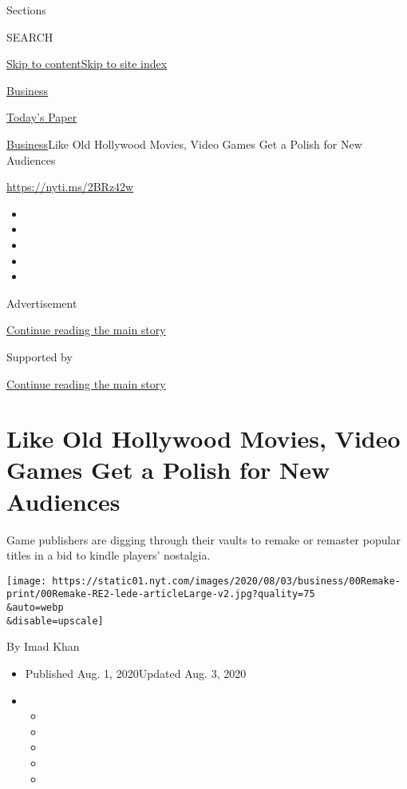 Sections

SEARCH

\protect\hyperlink{site-content}{Skip to
content}\protect\hyperlink{site-index}{Skip to site index}

\href{https://www.nytimes.com/section/business}{Business}

\href{https://myaccount.nytimes.com/auth/login?response_type=cookie\&client_id=vi}{}

\href{https://www.nytimes.com/section/todayspaper}{Today's Paper}

\href{/section/business}{Business}\textbar{}Like Old Hollywood Movies,
Video Games Get a Polish for New Audiences

\url{https://nyti.ms/2BRz42w}

\begin{itemize}
\item
\item
\item
\item
\item
\end{itemize}

Advertisement

\protect\hyperlink{after-top}{Continue reading the main story}

Supported by

\protect\hyperlink{after-sponsor}{Continue reading the main story}

\hypertarget{like-old-hollywood-movies-video-games-get-a-polish-for-new-audiences}{%
\section{Like Old Hollywood Movies, Video Games Get a Polish for New
Audiences}\label{like-old-hollywood-movies-video-games-get-a-polish-for-new-audiences}}

Game publishers are digging through their vaults to remake or remaster
popular titles in a bid to kindle players' nostalgia.

\texttt{[image: https://static01.nyt.com/images/2020/08/03/business/00Remake-print/00Remake-RE2-lede-articleLarge-v2.jpg?quality=75\\\&auto=webp\\\&disable=upscale]}

By Imad Khan

\begin{itemize}
\item
  Published Aug. 1, 2020Updated Aug. 3, 2020
\item
  \begin{itemize}
  \item
  \item
  \item
  \item
  \item
  \end{itemize}
\end{itemize}

